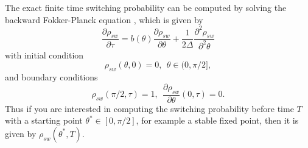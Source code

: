 \documentclass[journal,transmag]{IEEEtran}
\begin{document}
The exact finite time switching probability can be computed by solving the backward Fokker-Planck equation \cite{gardiner2004handbook}, which is given by
\begin{equation} \label{bfp:1}
\frac{\partial \rho_{sw}}{\partial \tau}
=  b(\theta)\frac{\partial  \rho_{sw} }{\partial \theta} +  \frac{1}{2 \Delta}  \frac{\partial^2  \rho_{sw}}{\partial^2 \theta}
\end{equation}
with initial condition
\begin{equation}
\rho_{sw}(\theta,0) = 0 , \ \ \theta \in (0,\pi/2],
\end{equation}
and boundary conditions
\begin{equation}
\rho_{sw}(\pi/2,\tau) = 1, \   \  \frac{\partial \rho_{sw}}{\partial \theta}(0,\tau)  = 0.
\end{equation}
Thus if you are interested in computing the switching probability before time $T$ with a starting point $\theta^* \in [0,\pi/2]$, for example a stable fixed point, then it is given by  $\rho_{sw}(\theta^*,T).$
\end{document}
